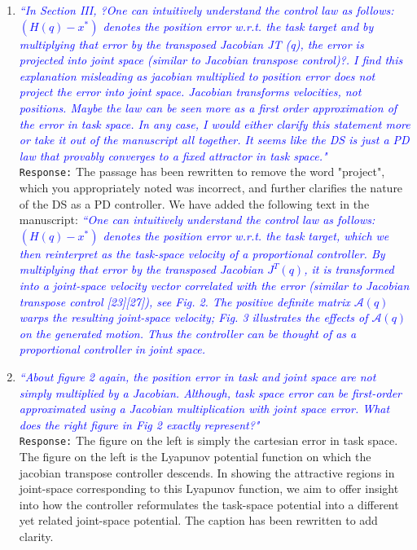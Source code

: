 \documentclass{article}
\begin{document}
\begin{enumerate}
\item \textcolor{blue}{\textit{``In Section III, ?One can intuitively understand the control law as follows:$(H(q) - x^*)$ denotes the
position error w.r.t. the task target and by multiplying that error by the transposed Jacobian JT (q),
the error is projected into joint space (similar to Jacobian transpose control)?. I find this explanation
misleading as jacobian multiplied to position error does not project the error into joint space. Jacobian
transforms velocities, not positions. Maybe the law can be seen more as a first order approximation
of the error in task space. In any case, I would either clarify this statement more or take it out of the
manuscript all together. It seems like the DS is just a PD law that provably converges to a fixed attractor
in task space."}}\\
\texttt{Response:} \small The passage has been rewritten to remove the word "project", which you appropriately noted was incorrect, and further clarifies the nature of the DS as a PD controller. We have added the following text in the manuscript: 
\textcolor{blue}{\textit{``One can intuitively understand the control law as follows: $(H(q) - x^*)$ denotes the position error w.r.t. the task target, which we then reinterpret as the task-space velocity of a proportional controller. By multiplying that error by the transposed Jacobian $J^T(q)$, it is transformed into a joint-space velocity vector correlated with the error (similar to Jacobian transpose control [23][27]), see Fig. 2. The positive definite matrix $\mathcal{A}(q)$ warps the resulting joint-space velocity; Fig. 3 illustrates the effects of  $\mathcal{A}(q)$ on the generated motion. Thus the controller can be thought of as a proportional controller in joint space.}}\\

\item \textcolor{blue}{\textit{``About figure 2 again, the position error in task and joint space are not simply multiplied by a Jacobian.
Although, task space error can be first-order approximated using a Jacobian multiplication with
joint space error. What does the right figure in Fig 2 exactly represent?"}}\\
\texttt{Response:} \small The figure on the left is simply the cartesian error in task space. The figure on the left is the Lyapunov potential function on which the jacobian transpose controller descends. In showing the attractive regions in joint-space corresponding to this Lyapunov function, we aim to offer insight into how the controller reformulates the task-space potential into a different yet related joint-space potential. The caption has been rewritten to add clarity.\\


\end{enumerate}
\end{document}
